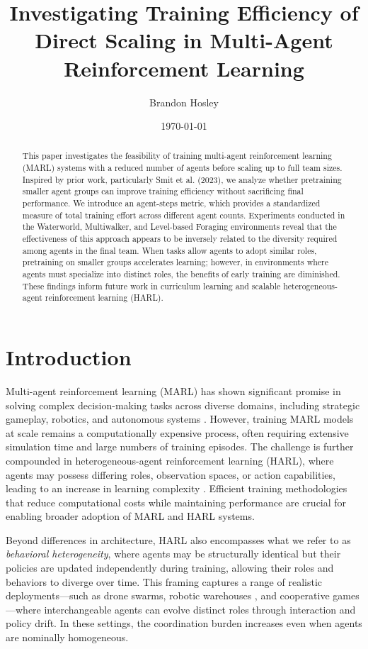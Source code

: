 \documentclass{article}
\title{Investigating Training Efficiency of Direct Scaling in Multi-Agent Reinforcement Learning}
\author{Brandon Hosley}
\date{\today}
\begin{document}
\maketitle

\begin{abstract}
    This paper investigates the feasibility of training multi-agent reinforcement learning (MARL) 
    systems with a reduced number of agents before scaling up to full team sizes. 
    Inspired by prior work, particularly Smit et al. (2023), 
    we analyze whether pretraining smaller agent groups can improve training efficiency 
    without sacrificing final performance. 
    We introduce an agent-steps metric, which provides a standardized measure of 
    total training effort across different agent counts.
    Experiments conducted in the Waterworld, Multiwalker, and Level-based Foraging environments 
    reveal that the effectiveness of this approach appears to be inversely related 
    to the diversity required among agents in the final team. 
    When tasks allow agents to adopt similar roles, 
    pretraining on smaller groups accelerates learning; 
    however, in environments where agents must specialize into distinct roles, 
    the benefits of early training are diminished. 
    These findings inform future work in curriculum learning and scalable 
    heterogeneous-agent reinforcement learning (HARL).
\end{abstract}

\section{Introduction}

Multi-agent reinforcement learning (MARL) has shown significant promise in solving complex 
decision-making tasks across diverse domains, including strategic gameplay, robotics, 
and autonomous systems \cite{silver2016, vinyals2019, berner2019}. 
However, training MARL models at scale remains a computationally expensive process, 
often requiring extensive simulation time and large numbers of training episodes. 
The challenge is further compounded in heterogeneous-agent reinforcement learning (HARL), 
where agents may possess differing roles, observation spaces, or action capabilities, 
leading to an increase in learning complexity \cite{rizk2019, yang2021a}.
Efficient training methodologies that reduce computational costs while maintaining 
performance are crucial for enabling broader adoption of MARL and HARL systems.

Beyond differences in architecture, HARL also encompasses what we refer to as 
\emph{behavioral heterogeneity}, %
where agents may be structurally identical but their policies are updated independently 
during training, allowing their roles and behaviors to diverge over time.
This framing captures a range of realistic deployments—such as drone swarms, 
robotic warehouses \cite{rizk2019}, and cooperative games—where interchangeable agents 
can evolve distinct roles through interaction and policy drift. 
In these settings, the coordination burden increases even when agents are nominally homogeneous.
\end{document}
